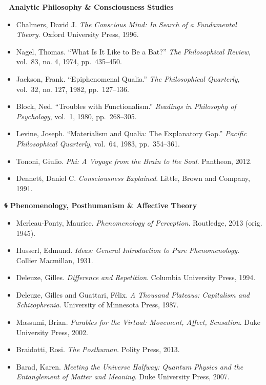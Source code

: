 \textbf{🧠 Analytic Philosophy \& Consciousness Studies}

\begin{itemize}
\tightlist
\item
  Chalmers, David J. \emph{The Conscious Mind: In Search of a
  Fundamental Theory}. Oxford University Press, 1996.
\item
  Nagel, Thomas. ``What Is It Like to Be a Bat?'' \emph{The
  Philosophical Review}, vol.~83, no. 4, 1974, pp.~435--450.
\item
  Jackson, Frank. ``Epiphenomenal Qualia.'' \emph{The Philosophical
  Quarterly}, vol.~32, no. 127, 1982, pp.~127--136.
\item
  Block, Ned. ``Troubles with Functionalism.'' \emph{Readings in
  Philosophy of Psychology}, vol.~1, 1980, pp.~268--305.
\item
  Levine, Joseph. ``Materialism and Qualia: The Explanatory Gap.''
  \emph{Pacific Philosophical Quarterly}, vol.~64, 1983, pp.~354--361.
\item
  Tononi, Giulio. \emph{Phi: A Voyage from the Brain to the Soul}.
  Pantheon, 2012.
\item
  Dennett, Daniel C. \emph{Consciousness Explained}. Little, Brown and
  Company, 1991.
\end{itemize}

\textbf{🌀 Phenomenology, Posthumanism \& Affective Theory}

\begin{itemize}
\tightlist
\item
  Merleau-Ponty, Maurice. \emph{Phenomenology of Perception}. Routledge,
  2013 (orig. 1945).
\item
  Husserl, Edmund. \emph{Ideas: General Introduction to Pure
  Phenomenology}. Collier Macmillan, 1931.
\item
  Deleuze, Gilles. \emph{Difference and Repetition}. Columbia University
  Press, 1994.
\item
  Deleuze, Gilles and Guattari, Félix. \emph{A Thousand Plateaus:
  Capitalism and Schizophrenia}. University of Minnesota Press, 1987.
\item
  Massumi, Brian. \emph{Parables for the Virtual: Movement, Affect,
  Sensation}. Duke University Press, 2002.
\item
  Braidotti, Rosi. \emph{The Posthuman}. Polity Press, 2013.
\item
  Barad, Karen. \emph{Meeting the Universe Halfway: Quantum Physics and
  the Entanglement of Matter and Meaning}. Duke University Press, 2007.
\end{itemize}

